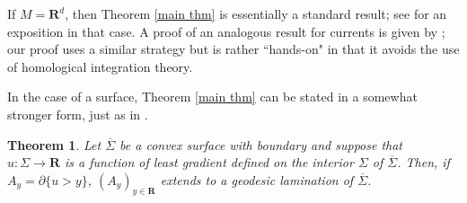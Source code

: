 \documentclass[reqno,12pt,letterpaper]{amsart}
\newcommand{\RR}{\mathbf{R}}
\newtheorem{theorem}{Theorem}[section]
\newtheorem{corollary}[theorem]{Corollary}
\theoremstyle{definition}
\newtheorem{example}[theorem]{Example}
\numberwithin{equation}{section}
\begin{document}
If $M = \RR^d$, then Theorem \ref{main thm} is essentially a standard result; see \cite[Proposition 3.4]{górny2017planar} for an exposition in that case.
A proof of an analogous result for currents is given by \cite[\S5.3]{federer2014geometric}; our proof uses a similar strategy but is rather ``hands-on" in that it avoids the use of homological integration theory.

In the case of a surface, Theorem \ref{main thm} can be stated in a somewhat stronger form, just as in \cite[Corollary 3.5]{górny2017planar}.

\begin{theorem}\label{main crly}
Let $\overline \Sigma$ be a convex surface with boundary and suppose that $u: \Sigma \to \RR$ is a function of least gradient defined on the interior $\Sigma$ of $\overline \Sigma$.
Then, if $A_y = \partial \{u > y\}$, $(A_y)_{y \in \RR}$ extends to a geodesic lamination of $\overline \Sigma$.
\end{theorem}
%
%
%
%
%
\end{document}
